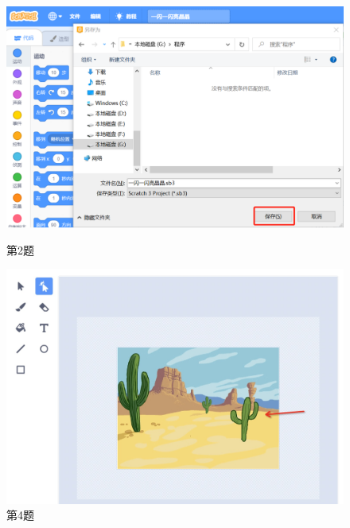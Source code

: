 \documentclass[10pt, a4paper]{article}
\begin{document}
\begin{enumerate}
        \begin{figure}[htbp]
            \centering
            \begin{minipage}[t]{.35\textwidth}
                \centering
                \includegraphics[width=1\textwidth]{2.png}
                \caption*{第2题}
            \end{minipage}
            \begin{minipage}[t]{.34\textwidth}
                \centering
                \includegraphics[width=\textwidth]{4.jpg}
                \caption*{第4题}
            \end{minipage}
            \begin{minipage}[t]{.24\textwidth}
                \centering

\end{minipage}
\end{figure}
\end{enumerate}
\end{document}
